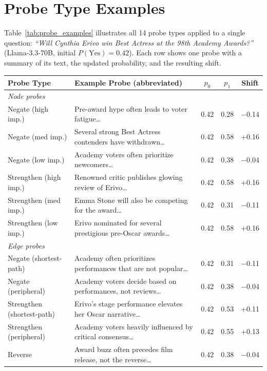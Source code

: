 \documentclass[11pt]{article}
\begin{document}
\section{Probe Type Examples}
\label{app:probe-examples}

Table~\ref{tab:probe_examples} illustrates all 14 probe types applied to a single question: \emph{``Will Cynthia Erivo win Best Actress at the 98th Academy Awards?''} (Llama-3.3-70B, initial $P(\text{Yes}) = 0.42$). Each row shows one probe with a summary of its text, the updated probability, and the resulting shift.

\begin{table}[t]
\centering
\small
\begin{tabular}{llccc}
\toprule
\textbf{Probe Type} & \textbf{Example Probe (abbreviated)} & \textbf{$p_0$} & \textbf{$p_1$} & \textbf{Shift} \\
\midrule
\multicolumn{5}{l}{\textit{Node probes}} \\
Negate (high imp.) & Pre-award hype often leads to voter fatigue\ldots & 0.42 & 0.28 & $-$0.14 \\
Negate (med imp.) & Several strong Best Actress contenders have withdrawn\ldots & 0.42 & 0.58 & +0.16 \\
Negate (low imp.) & Academy voters often prioritize newcomers\ldots & 0.42 & 0.38 & $-$0.04 \\
Strengthen (high imp.) & Renowned critic publishes glowing review of Erivo\ldots & 0.42 & 0.58 & +0.16 \\
Strengthen (med imp.) & Emma Stone will also be competing for the award\ldots & 0.42 & 0.31 & $-$0.11 \\
Strengthen (low imp.) & Erivo nominated for several prestigious pre-Oscar awards\ldots & 0.42 & 0.58 & +0.16 \\
\midrule
\multicolumn{5}{l}{\textit{Edge probes}} \\
Negate (shortest-path) & Academy often prioritizes performances that are not popular\ldots & 0.42 & 0.31 & $-$0.11 \\
Negate (peripheral) & Academy voters decide based on performances, not reviews\ldots & 0.42 & 0.38 & $-$0.04 \\
Strengthen (shortest-path) & Erivo's stage performance elevates her Oscar narrative\ldots & 0.42 & 0.53 & +0.11 \\
Strengthen (peripheral) & Academy voters heavily influenced by critical consensus\ldots & 0.42 & 0.55 & +0.13 \\
Reverse & Award buzz often precedes film release, not the reverse\ldots & 0.42 & 0.38 & $-$0.04 \\

\end{tabular}
\end{table}
\end{document}
